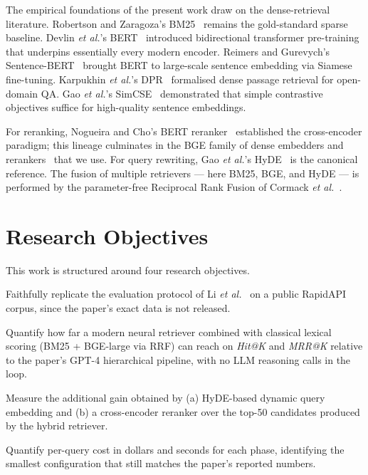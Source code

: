 \documentclass[10pt,a4paper,twocolumn]{article}
\begin{document}
The empirical foundations of the present work draw on the
dense-retrieval literature. Robertson and Zaragoza's
BM25~\cite{robertson2009bm25} remains the gold-standard sparse
baseline. Devlin \textit{et al.}'s BERT~\cite{devlin2019bert}
introduced bidirectional transformer pre-training that underpins
essentially every modern encoder. Reimers and Gurevych's
Sentence-BERT~\cite{reimers2019sbert} brought BERT to large-scale
sentence embedding via Siamese fine-tuning. Karpukhin
\textit{et al.}'s DPR~\cite{karpukhin2020dpr} formalised dense passage
retrieval for open-domain QA. Gao
\textit{et al.}'s SimCSE~\cite{gao2021simcse} demonstrated that simple
contrastive objectives suffice for high-quality sentence embeddings.

For reranking, Nogueira and Cho's BERT
reranker~\cite{nogueira2019passage} established the cross-encoder
paradigm; this lineage culminates in the BGE family of dense embedders
and rerankers~\cite{xiao2023cpack} that we use. For query rewriting,
Gao \textit{et al.}'s HyDE~\cite{gao2023hyde} is the canonical
reference. The fusion of multiple retrievers --- here BM25, BGE, and
HyDE --- is performed by the parameter-free Reciprocal Rank Fusion of
Cormack \textit{et al.}~\cite{cormack2009rrf}.

\section{Research Objectives}\label{sec:objectives}

This work is structured around four research objectives.

\begin{description}[leftmargin=*]
    \item[\textbf{RO-1: Reproducibility.}] Faithfully replicate the
          evaluation protocol of Li \textit{et al.}~\cite{li2025llm} on
          a public RapidAPI corpus, since the paper's exact data is
          not released.
    \item[\textbf{RO-2: Retrieval ceiling.}] Quantify how far a modern
          neural retriever combined with classical lexical scoring
          (BM25 + BGE-large via RRF) can reach on \emph{Hit@K} and
          \emph{MRR@K} relative to the paper's GPT-4 hierarchical
          pipeline, with no LLM reasoning calls in the loop.
    \item[\textbf{RO-3: Reranking gain.}] Measure the additional gain
          obtained by (a) HyDE-based dynamic query embedding and (b) a
          cross-encoder reranker over the top-50 candidates produced
          by the hybrid retriever.
    \item[\textbf{RO-4: Cost--accuracy trade-off.}] Quantify per-query
          cost in dollars and seconds for each phase, identifying the
          smallest configuration that still matches the paper's
          reported numbers.
\end{description}
\end{document}
